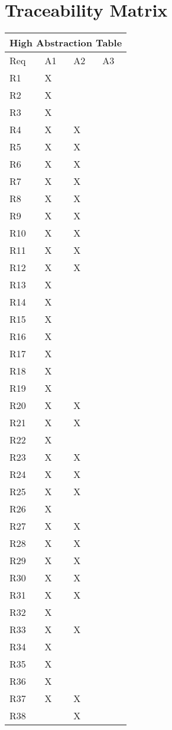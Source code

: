 \documentclass{article}
\begin{document}
\section{Traceability Matrix}
\begin{tabular}{|l|l|l|l|}
\hline
\multicolumn{4}{|c|}{High Abstraction Table}\\\hline
Req& A1& A2&A3\\\hline\hline
R1 &X&& \\\hline
R2 &X&& \\\hline
R3 &X&& \\\hline
R4 &X&X& \\\hline
R5 &X&X& \\\hline
R6 &X&X& \\\hline
R7 &X&X& \\\hline
R8 &X&X& \\\hline
R9 &X&X& \\\hline
R10 &X&X& \\\hline
R11 &X&X& \\\hline
R12 &X&X&\\\hline
R13 &X&& \\\hline
R14 &X&& \\\hline
R15 &X&& \\\hline
R16 &X&& \\\hline
R17 &X&& \\\hline
R18 &X&& \\\hline
R19 &X&& \\\hline
R20 &X&X& \\\hline
R21 &X&X& \\\hline
R22 &X&& \\\hline
R23 &X&X& \\\hline
R24 &X&X& \\\hline
R25 &X&X& \\\hline
R26 &X&& \\\hline
R27 &X&X& \\\hline
R28 &X&X& \\\hline
R29 &X&X& \\\hline
R30 &X&X& \\\hline
R31 &X&X& \\\hline
R32 &X&& \\\hline
R33 &X&X& \\\hline
R34 &X&& \\\hline
R35 &X&& \\\hline
R36 &X&& \\\hline
R37 &X&X& \\\hline
R38 &&X& \\\hline

\end{tabular}
\end{document}
